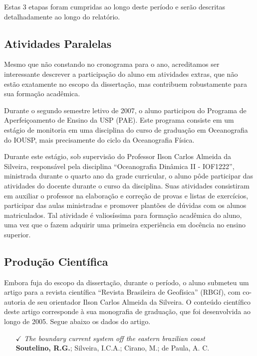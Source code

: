 \documentclass[12pt,portuguese,a4paper,pdftex]{article}
\begin{document}
Estas 3 etapas foram cumpridas ao longo deste período e serão descritas detalhadamente ao longo do relatório.

   \subsection{Atividades Paralelas}\label{sec:extras}

\hspace{4mm} Mesmo que não constando no cronograma para o ano, acreditamos ser interessante 
descrever a participação do aluno em atividades extras, que não estão exatamente no escopo da dissertação, 
mas contribuem robustamente para sua formação acadêmica. 

Durante o segundo semestre letivo de 2007, o aluno participou do Programa de Aperfeiçoamento 
de Ensino da USP (PAE). Este programa consiste em um estágio de monitoria em uma disciplina 
do curso de graduação em Oceanografia do IOUSP, mais precisamente do ciclo da Oceanografia Física. 

Durante este estágio, sob supervisão do Professor Ilson Carlos Almeida da Silveira, responsável pela disciplina 
``Oceanografia Dinâmica II - IOF1222'', ministrada durante o quarto ano da grade curricular, o aluno 
pôde participar das atividades do docente durante o curso da disciplina. Suas atividades consistiram em
auxiliar o professor na elaboração e correção de provas e listas de exercícios, participar das aulas 
ministradas e promover plantões de dúvidas com os alunos matriculados. Tal atividade é valiosíssima para formação acadêmica
 do aluno, uma vez que o fazem adquirir uma primeira experiência em docência no ensino superior. 

   \subsection{Produção Científica}\label{sec:prod}

\hspace{4mm} Embora fuja do escopo da dissertação, durante o período, o aluno submeteu um artigo para a revista científica
``Revista Brasileira de Geofísica'' (RBGf), com co-autoria de seu orientador Ilson Carlos Almeida da Silveira. O conteúdo científico
deste artigo corresponde à sua monografia de graduação, que foi desenvolvida ao longo de 2005. Segue abaixo os dados do artigo.   

\begin{itemize}

\item[$\checkmark$] {\it The boundary current system off the eastern brazilian coast}\\ 
{\bf Soutelino, R.G.}; Silveira, I.C.A.; Cirano, M.;  de Paula, A. C.

\end{itemize}
\end{document}
